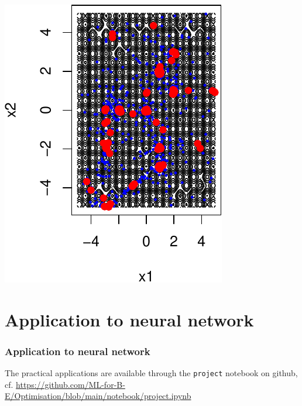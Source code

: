 \documentclass[12pt]{beamer}
\begin{document}
\begin{frame}
\begin{center}
{\begin{minipage}[t]{0.4\textwidth}
\includegraphics[width=\textwidth]{rastrigin_budget1000_restart10_x-crop.pdf}
\end{minipage}
}
\end{center}
\end{frame}


\section{Application to neural network}

\begin{frame}%
\frametitle{Application to neural network} 
\begin{center}
The practical applications are available through the \texttt{project} notebook on github,
cf. \url{https://github.com/ML-for-B-E/Optimisation/blob/main/notebook/project.ipynb}
\end{center}
\end{frame}
\end{document}
